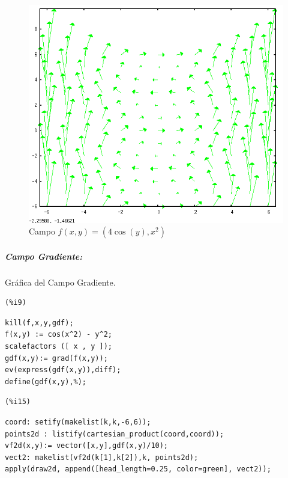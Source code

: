 \documentclass[12pt]{article}
\begin{document}
\begin{figure}[H]
\centering
\includegraphics[scale=0.5]{9.png}
\caption{Campo  $f(x,y)= (4\cos(y),x^2)$ }
\end{figure}


\subparagraph{Campo Gradiente:}
Gráfica del Campo Gradiente.

\noindent
\begin{minipage}[t]{8ex}{\color{red}\bf
\begin{verbatim}
(%i9) 
\end{verbatim}}
\end{minipage}
\begin{minipage}[t]{\textwidth}{\color{blue}
\begin{verbatim}
kill(f,x,y,gdf);
f(x,y) := cos(x^2) - y^2;
scalefactors ([ x , y ]);
gdf(x,y):= grad(f(x,y));
ev(express(gdf(x,y)),diff);
define(gdf(x,y),%);
\end{verbatim}}
\end{minipage}

\noindent
\begin{minipage}[t]{8ex}{\color{red}\bf
\begin{verbatim}
(%i15) 
\end{verbatim}}
\end{minipage}
\begin{minipage}[t]{\textwidth}{\color{blue}
\begin{verbatim}
coord: setify(makelist(k,k,-6,6));
points2d : listify(cartesian_product(coord,coord));
vf2d(x,y):= vector([x,y],gdf(x,y)/10);
vect2: makelist(vf2d(k[1],k[2]),k, points2d);
apply(draw2d, append([head_length=0.25, color=green], vect2));
\end{verbatim}}
\end{minipage}
\end{document}

